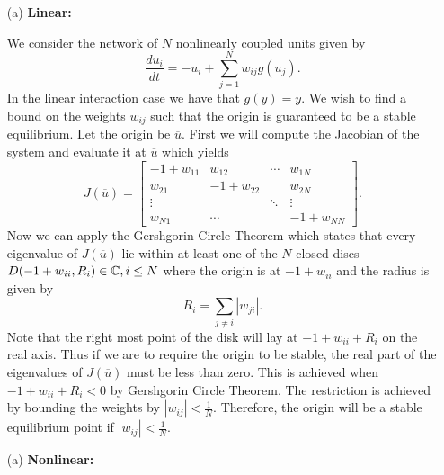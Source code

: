 \documentclass[12pt]{report}
\begin{document}
\begin{solution}

    \noindent
    \begin{itemize}
        \item[(a)]
        {\bf Linear:}
        
        We consider the network of $N$ nonlinearly coupled units given by
        \[ 
            \frac{du_i}{dt} = - u_i +  \sum_{j=1}^N w_{ij} g(u_j).
        \]
        In the linear interaction case we have that $g(y) = y$. We wish to find a bound on the weights $w_{ij}$ such that the origin is guaranteed to be a stable equilibrium. Let the origin be $\overline{u}$. First we will compute the Jacobian of the system and evaluate it at $\overline{u}$ which yields 
        \[ 
            J(\overline{u})=\begin{bmatrix}
                -1 + w_{11} & w_{12} &\cdots & w_{1N}\\
                w_{21} & -1 + w_{22} && w_{2N}\\
                \vdots && \ddots &\vdots\\
                w_{N1} & \cdots && -1 + w_{NN}
            \end{bmatrix}.
        \]  
        Now we can apply the Gershgorin Circle Theorem which states that every eigenvalue of $J(\overline{u})$ lie within at least one of the $N$ closed discs $D(-1 + w_{ii},R_i) \in {\mathbb C}, i \leq N$ where the origin is at $-1 + w_{ii}$ and the radius is given by
        \[ 
            R_i = \sum_{j \neq i} |w_{ji}|.
        \]
        Note that the right most point of the disk will lay at $-1 + w_{ii} + R_i$ on the real axis. Thus if we are to require the origin to be stable, the real part of the eigenvalues of $J(\overline{u})$ must be less than zero. This is achieved when $-1 + w_{ii} + R_i < 0$ by Gershgorin Circle Theorem. The restriction is achieved by bounding the weights by $|w_{ij}| < \frac{1}{N}$. Therefore, the origin will be a stable equilibrium point if $|w_{ij}| < \frac{1}{N}$.

        \item[(a)]
        {\bf Nonlinear:}
        

\end{itemize}
\end{solution}
\end{document}

